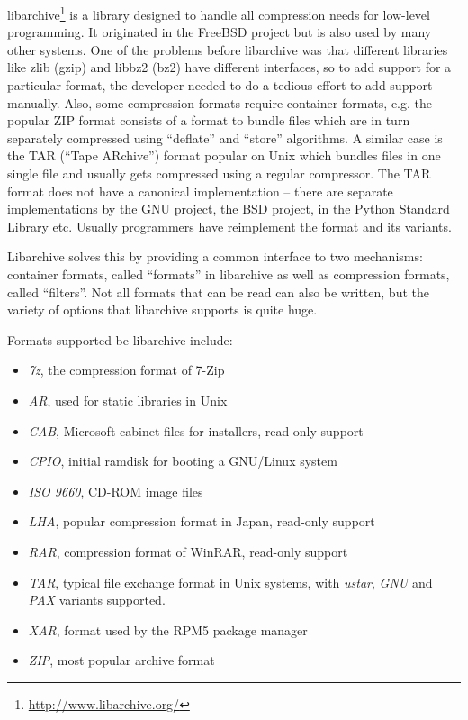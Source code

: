 \documentclass[parskip=half]{scrreprt}
\begin{document}
libarchive\footnote{\url{http://www.libarchive.org/}} is a library designed to
handle all compression needs for low-level programming. It originated in the
FreeBSD project but is also used by many other systems. One of the problems
before libarchive was that different libraries like zlib (gzip) and libbz2
(bz2) have different interfaces, so to add support for a particular format, the
developer needed to do a tedious effort to add support manually. Also, some
compression formats require container formats, e.g. the popular ZIP format
consists of a format to bundle files which are in turn separately compressed
using \enquote{deflate} and \enquote{store} algorithms. A similar case is the
TAR (\enquote{Tape ARchive}) format popular on Unix which bundles files in one
single file and usually gets compressed using a regular compressor. The TAR
format does not have a canonical implementation -- there are separate
implementations by the GNU project, the BSD project, in the Python Standard
Library etc. Usually programmers have reimplement the format and its variants.

Libarchive solves this by providing a common interface to two mechanisms:
container formats, called \enquote{formats} in libarchive as well as
compression formats, called \enquote{filters}. Not all formats that can be read
can also be written, but the variety of options that libarchive supports is
quite huge.

Formats supported be libarchive include:

\begin{itemize}
  \item \emph{7z}, the compression format of 7-Zip
  \item \emph{AR}, used for static libraries in Unix
  \item \emph{CAB}, Microsoft cabinet files for installers, read-only support
  \item \emph{CPIO}, initial ramdisk for booting a GNU/Linux system
  \item \emph{ISO 9660}, CD-ROM image files
  \item \emph{LHA}, popular compression format in Japan, read-only support
  \item \emph{RAR}, compression format of WinRAR, read-only support
  \item \emph{TAR}, typical file exchange format in Unix systems, with
    \emph{ustar}, \emph{GNU} and \emph{PAX} variants supported.
  \item \emph{XAR}, format used by the RPM5 package manager
  \item \emph{ZIP}, most popular archive format
\end{itemize}
\end{document}
